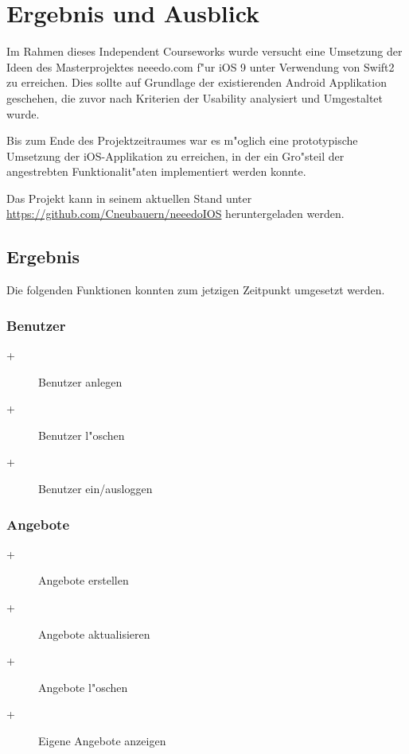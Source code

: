 \section{Ergebnis und Ausblick }

Im Rahmen dieses Independent Courseworks wurde versucht eine Umsetzung der Ideen des Masterprojektes neeedo.com f"ur iOS 9 unter Verwendung von Swift2 zu erreichen. 
Dies sollte auf Grundlage der existierenden Android Applikation geschehen, die zuvor nach Kriterien der Usability analysiert und Umgestaltet wurde. 

Bis zum Ende des Projektzeitraumes war es m"oglich eine prototypische Umsetzung der iOS-Applikation zu erreichen, in der ein Gro"steil der angestrebten Funktionalit"aten implementiert werden konnte.

Das Projekt kann in seinem aktuellen Stand unter \url{https://github.com/Cneubauern/neeedoIOS} heruntergeladen werden.

\subsection{Ergebnis}

Die folgenden Funktionen konnten zum jetzigen Zeitpunkt umgesetzt werden.
\subsubsection*{Benutzer}
\begin{description}
\item [+]Benutzer anlegen \vspace{-0,2cm}
\item [+]Benutzer l"oschen \vspace{-0,2cm}
\item [+]Benutzer ein/ausloggen \vspace{-0,2cm}
\end{description}

\subsubsection*{Angebote}
\begin{description}
\item [+]Angebote erstellen \vspace{-0,2cm}
\item [+]Angebote aktualisieren  \vspace{-0,2cm}
\item [+]Angebote l"oschen \vspace{-0,2cm}
\item [+]Eigene Angebote anzeigen \vspace{-0,2cm}
\end{description}

